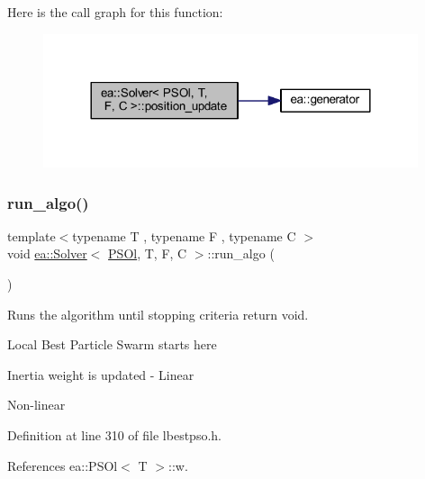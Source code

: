 Here is the call graph for this function\+:
\nopagebreak
\begin{figure}[H]
\begin{center}
\leavevmode
\includegraphics[width=312pt]{classea_1_1_solver_3_01_p_s_ol_00_01_t_00_01_f_00_01_c_01_4_a9f20cae513cb6a44dddc59ef43ee206f_cgraph}
\end{center}
\end{figure}
\mbox{\label{classea_1_1_solver_3_01_p_s_ol_00_01_t_00_01_f_00_01_c_01_4_a0fa43e874bb60282a742c4c3dff651a9}} 
\subsubsection{\texorpdfstring{run\+\_\+algo()}{run\_algo()}}
{\footnotesize\ttfamily template$<$typename T , typename F , typename C $>$ \\
void \hyperlink{classea_1_1_solver}{ea\+::\+Solver}$<$ \hyperlink{structea_1_1_p_s_ol}{P\+S\+Ol}, T, F, C $>$\+::run\+\_\+algo (\begin{DoxyParamCaption}{ }\end{DoxyParamCaption})\hspace{0.3cm}{\ttfamily [private]}}



Runs the algorithm until stopping criteria return void. 

Local Best Particle Swarm starts here

Inertia weight is updated -\/ Linear

Non-\/linear 

Definition at line 310 of file lbestpso.\+h.



References ea\+::\+P\+S\+Ol$<$ T $>$\+::w.


